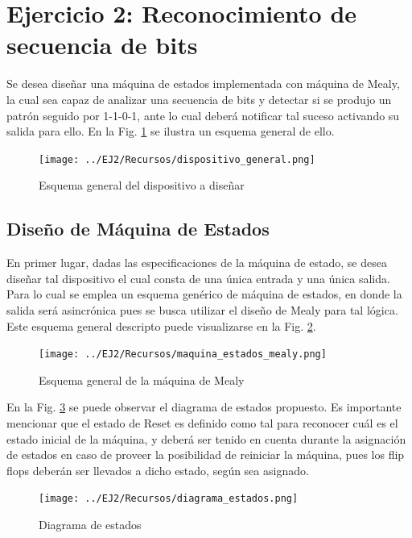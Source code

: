 \section{Ejercicio 2: Reconocimiento de secuencia de bits}
Se desea dise\~nar una m\'aquina de estados implementada con m\'aquina de Mealy, la cual sea capaz de analizar una secuencia de bits y detectar si se produjo un patr\'on
seguido por 1-1-0-1, ante lo cual deber\'a notificar tal suceso activando su salida para ello. En la Fig. \ref{fig:esquema_general_dispositivo} se ilustra un esquema general de ello.

\begin{figure}[H]
    \centering
    \texttt{[image: ../EJ2/Recursos/dispositivo\_general.png]}
    \caption{Esquema general del dispositivo a dise\~nar}
    \label{fig:esquema_general_dispositivo}
\end{figure}

\subsection{Dise\~no de M\'aquina de Estados}
En primer lugar, dadas las especificaciones de la m\'aquina de estado, se desea dise\~nar tal dispositivo el cual consta de una \'unica entrada y una \'unica salida. Para lo cual se
emplea un esquema gen\'erico de m\'aquina de estados, en donde la salida ser\'a asincr\'onica pues se busca utilizar el dise\~no de Mealy para tal l\'ogica. Este esquema general descripto
puede visualizarse en la Fig. \ref{fig:esquema_general_mealy}.

\begin{figure}[H]
    \centering
    \texttt{[image: ../EJ2/Recursos/maquina\_estados\_mealy.png]}
    \caption{Esquema general de la m\'aquina de Mealy}
    \label{fig:esquema_general_mealy}
\end{figure}

En la Fig. \ref{fig:diagrama_estados_ejercicio_2} se puede observar el diagrama de estados propuesto. Es importante mencionar que el estado de Reset es definido como tal
para reconocer cu\'al es el estado inicial de la m\'aquina, y deber\'a ser tenido en cuenta durante la asignaci\'on de estados en caso de proveer la posibilidad de reiniciar la m\'aquina,
pues los flip flops deber\'an ser llevados a dicho estado, seg\'un sea asignado.

\begin{figure}[H]
    \centering
    \texttt{[image: ../EJ2/Recursos/diagrama\_estados.png]}
    \caption{Diagrama de estados}
    \label{fig:diagrama_estados_ejercicio_2}
\end{figure}

